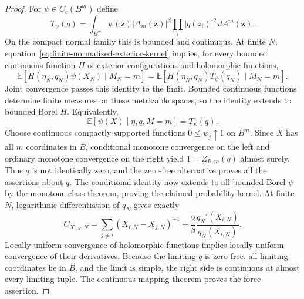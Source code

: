 \documentclass[11pt,a4paper]{article}
\numberwithin{equation}{section}
\theoremstyle{definition}
\theoremstyle{remark}
\begin{document}
\begin{proof}
For $\psi\in C_c(B^m)$ define
\[
 T_\psi(q)=\int_{B^m}\psi(\mathbf z)|\Delta_m(\mathbf z)|^\beta
                         \prod_i|q(z_i)|^2\,dA^m(\mathbf z).
\]
On the compact normal family this is bounded and continuous. At finite
$N$, equation~\eqref{eq:finite-normalized-exterior-kernel} implies, for
every bounded continuous function $H$ of exterior configurations and
holomorphic functions,
\[
 \mathbb E[H(\eta_N,q_N)\psi(X_N)\mid M_N=m]
   =\mathbb E[H(\eta_N,q_N)T_\psi(q_N)\mid M_N=m].
\]
Joint convergence passes this identity to the limit. Bounded
continuous functions determine finite measures on these metrizable
spaces, so the identity extends to bounded Borel $H$. Equivalently,
\[
 \mathbb E[\psi(X)\mid\eta,q,M=m]=T_\psi(q).
\]
Choose continuous compactly supported functions
$0\le\psi_j\uparrow1$ on $B^m$. Since $X$ has all $m$ coordinates
in $B$, conditional monotone convergence on the left and ordinary
monotone convergence on the right yield
$1=Z_{B,m}(q)$ almost surely. Thus $q$ is not identically zero, and
the zero-free alternative proves all the assertions about $q$.
The conditional identity now extends to all bounded Borel $\psi$ by
the monotone-class theorem, proving the claimed probability kernel.
At finite $N$, logarithmic differentiation of $q_N$ gives exactly
\[
 C_{X_{i,N},N}=\sum_{j\ne i}(X_{i,N}-X_{j,N})^{-1}
                       +\frac2\beta\frac{q_N'(X_{i,N})}{q_N(X_{i,N})}.
\]
Locally uniform convergence of holomorphic functions implies locally
uniform convergence of their derivatives. Because the limiting $q$
is zero-free, all limiting coordinates lie in $B$, and the limit is
simple, the right side is continuous at almost every limiting tuple.
The continuous-mapping theorem proves the force assertion.
\end{proof}
\end{document}
